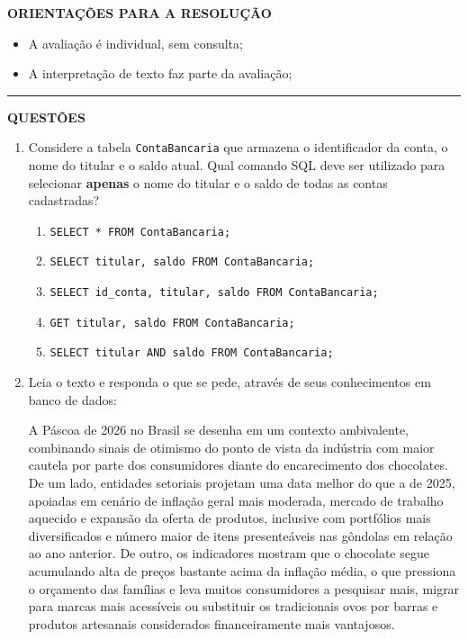 \documentclass[12pt,a4paper]{article}
\begin{document}
\textbf{ORIENTAÇÕES PARA A RESOLUÇÃO}  

\begin{itemize}
    \item A avaliação é individual, sem consulta;
    \item A interpretação de texto faz parte da avaliação;
\end{itemize}

\vspace{0.5cm}

\begin{center}
    \rule{\textwidth}{0.4pt}
    \textbf{QUESTÕES}
\end{center}

\vspace{0.5cm} 

\begin{enumerate}

      \item Considere a tabela \texttt{ContaBancaria} que armazena o identificador da conta, o nome do titular e o saldo atual. Qual comando SQL deve ser utilizado para selecionar \textbf{apenas} o nome do titular e o saldo de todas as contas cadastradas?

    \begin{enumerate}
        \item \texttt{SELECT * FROM ContaBancaria;}
        \item \texttt{SELECT titular, saldo FROM ContaBancaria;}
        \item \texttt{SELECT id\_conta, titular, saldo FROM ContaBancaria;}
        \item \texttt{GET titular, saldo FROM ContaBancaria;}
        \item \texttt{SELECT titular AND saldo FROM ContaBancaria;}
    \end{enumerate}


    \item Leia o texto e responda o que se pede, através de seus conhecimentos em banco de dados:
    
    
    A Páscoa de 2026 no Brasil se desenha em um contexto ambivalente, combinando sinais de otimismo do ponto de vista da indústria com maior cautela por parte dos consumidores diante do encarecimento dos chocolates. De um lado, entidades setoriais projetam uma data melhor do que a de 2025, apoiadas em cenário de inflação geral mais moderada, mercado de trabalho aquecido e expansão da oferta de produtos, inclusive com portfólios mais diversificados e número maior de itens presenteáveis nas gôndolas em relação ao ano anterior. De outro, os indicadores mostram que o chocolate segue acumulando alta de preços bastante acima da inflação média, o que pressiona o orçamento das famílias e leva muitos consumidores a pesquisar mais, migrar para marcas mais acessíveis ou substituir os tradicionais ovos por barras e produtos artesanais considerados financeiramente mais vantajosos.


\end{enumerate}
\end{document}
